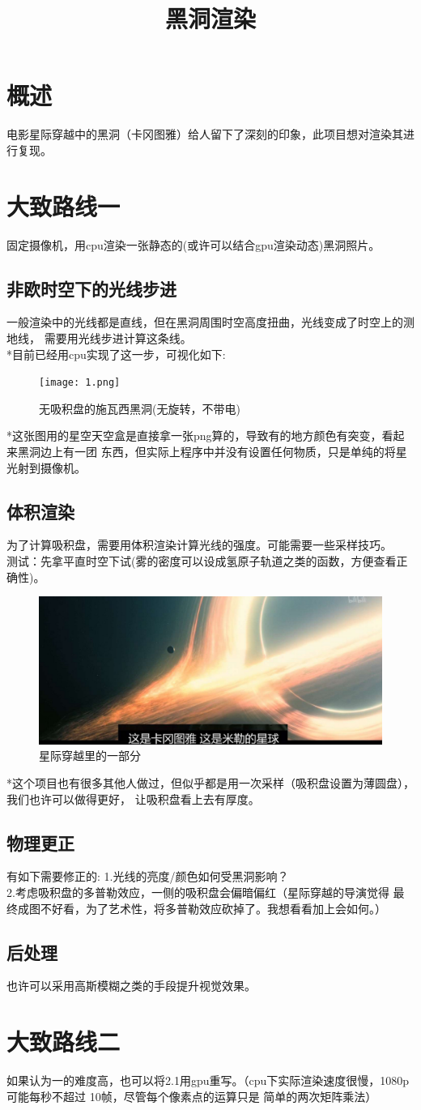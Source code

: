 \documentclass[a4paper, 12pt]{article}
\begin{document}
	\title{黑洞渲染}
    \section{概述}
    电影星际穿越中的黑洞（卡冈图雅）给人留下了深刻的印象，此项目想对渲染其进行复现。
    \section{大致路线一}
    固定摄像机，用cpu渲染一张静态的(或许可以结合gpu渲染动态)黑洞照片。
    \subsection{非欧时空下的光线步进}
    一般渲染中的光线都是直线，但在黑洞周围时空高度扭曲，光线变成了时空上的测地线，
    需要用光线步进计算这条线。\\
    *目前已经用cpu实现了这一步，可视化如下:
    \begin{figure}[H]
        \texttt{[image: 1.png]}
        \caption{无吸积盘的施瓦西黑洞(无旋转，不带电)} %
    \end{figure}
    *这张图用的星空天空盒是直接拿一张png算的，导致有的地方颜色有突变，看起来黑洞边上有一团
    东西，但实际上程序中并没有设置任何物质，只是单纯的将星光射到摄像机。
    \subsection{体积渲染}
    为了计算吸积盘，需要用体积渲染计算光线的强度。可能需要一些采样技巧。\\
    测试：先拿平直时空下试(雾的密度可以设成氢原子轨道之类的函数，方便查看正确性)。\\
    \begin{figure}[H]
        \includegraphics[width=1.0\textwidth]{2.png}
        \caption{星际穿越里的一部分} %
    \end{figure}
    *这个项目也有很多其他人做过，但似乎都是用一次采样（吸积盘设置为薄圆盘），我们也许可以做得更好，
    让吸积盘看上去有厚度。
    \subsection{物理更正}
    有如下需要修正的:
    1.光线的亮度/颜色如何受黑洞影响？\\
    2.考虑吸积盘的多普勒效应，一侧的吸积盘会偏暗偏红（星际穿越的导演觉得
    最终成图不好看，为了艺术性，将多普勒效应砍掉了。我想看看加上会如何。）
    \subsection{后处理}
    也许可以采用高斯模糊之类的手段提升视觉效果。
    \section{大致路线二}
    如果认为一的难度高，也可以将2.1用gpu重写。（cpu下实际渲染速度很慢，1080p可能每秒不超过
    10帧，尽管每个像素点的运算只是
    简单的两次矩阵乘法）
\end{document}
